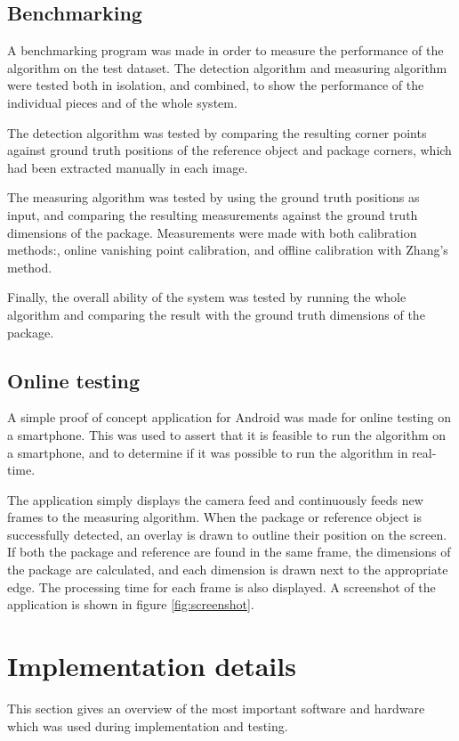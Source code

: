\subsection{Benchmarking} \label{benchmarking}
A benchmarking program was made in order to measure the performance of the algorithm on the test dataset.
The detection algorithm and measuring algorithm were tested both in isolation, and combined, to show the performance of the individual pieces and of the whole system. 

The detection algorithm was tested by comparing the resulting corner points against ground truth positions of the reference object and package corners, which had been extracted manually in each image.

The measuring algorithm was tested by using the ground truth positions as input, and comparing the resulting measurements against the ground truth dimensions of the package.
Measurements were made with both calibration methods:, online vanishing point calibration, and offline calibration with Zhang's method. 

Finally, the overall ability of the system was tested by running the whole algorithm and comparing the result with the ground truth dimensions of the package. 

\subsection{Online testing} \label{method:online_testing}
A simple proof of concept application for Android was made for online testing on a smartphone.
This was used to assert that it is feasible to run the algorithm on a smartphone, and to determine if it was possible to run the algorithm in real-time.

The application simply displays the camera feed and continuously feeds new frames to the measuring algorithm.
When the package or reference object is successfully detected, an overlay is drawn to outline their position on the screen.
If both the package and reference are found in the same frame, the dimensions of the package are calculated, and each dimension is drawn next to the appropriate edge.
The processing time for each frame is also displayed.
A screenshot of the application is shown in figure \ref{fig:screenshot}.

\section{Implementation details}
This section gives an overview of the most important software and hardware which was used during implementation and testing.


